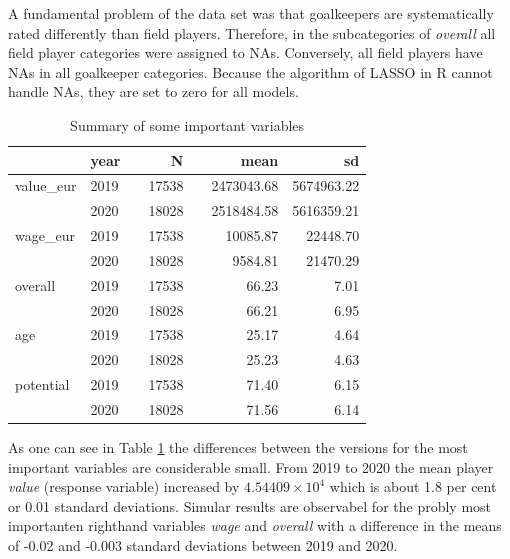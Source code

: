 \documentclass[12pt,a4paper]{article}
\begin{document}
A fundamental problem of the data set was that goalkeepers are
systematically rated differently than field players. Therefore, in the
subcategories of \emph{overall} all field player categories were
assigned to NAs. Conversely, all field players have NAs in all
goalkeeper categories. Because the algorithm of \ac{LASSO} in R cannot
handle NAs, they are set to zero for all models.

\begin{table}[!h]

\caption{\label{tab:unnamed-chunk-3}\label{tab:sum} Summary of some important variables}
\centering
\begin{tabular}[t]{lllrlrr}
\toprule
 & year &  & N &   & mean & sd\\
\midrule
\rowcolor{gray!6}  value\_eur & 2019 &  & 17538 &  & 2473043.68 & 5674963.22\\
 & 2020 &  & 18028 &  & 2518484.58 & 5616359.21\\
\rowcolor{gray!6}  wage\_eur & 2019 &  & 17538 &  & 10085.87 & 22448.70\\
 & 2020 &  & 18028 &  & 9584.81 & 21470.29\\
\rowcolor{gray!6}  overall & 2019 &  & 17538 &  & 66.23 & 7.01\\
 & 2020 &  & 18028 &  & 66.21 & 6.95\\
\rowcolor{gray!6}  age & 2019 &  & 17538 &  & 25.17 & 4.64\\
 & 2020 &  & 18028 &  & 25.23 & 4.63\\
\rowcolor{gray!6}  potential & 2019 &  & 17538 &  & 71.40 & 6.15\\
 & 2020 &  & 18028 &  & 71.56 & 6.14\\
\bottomrule
\end{tabular}
\end{table}

As one can see in Table \ref{tab:sum} the differences between the
versions for the most important variables are considerable small. From
2019 to 2020 the mean player \emph{value} (response variable) increased
by \ensuremath{4.54409\times 10^{4}} which is about 1.8 per cent or 0.01
standard deviations. Simular results are observabel for the probly most
importanten righthand variables \emph{wage} and \emph{overall} with a
difference in the means of -0.02 and -0.003 standard deviations between
2019 and 2020.
\end{document}

